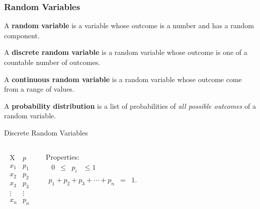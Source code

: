 \begin{frame}
  \frametitle{Random Variables}

  \begin{definition}
    A \textbf{random variable} is a variable whose outcome is a number
    and has a random component.
  \end{definition}

  {
    \begin{definition}
      A \textbf{discrete random variable} is a random variable whose
      outcome is one of a countable number of outcomes.
    \end{definition}
  }

  {
    \begin{definition}
      A \textbf{continuous random variable} is a random variable whose
      outcome come from a range of values.
    \end{definition}
  }

  {
    \begin{definition}
      A \textbf{probability distribution} is a list of probabilities of
      \textit{all possible outcomes} of a random variable.
    \end{definition}
  }

\end{frame}



\begin{frame}{Discrete Random Variables}

  \begin{columns}

    \begin{eqnarray*}
      \begin{array}{l|l}
        \mathrm{X} & p \\ \hline
        x_1 & p_1 \\
        x_2 & p_2 \\
        x_3 & p_3 \\
        \vdots & \vdots \\
        x_n & p_n
      \end{array}
    \end{eqnarray*}

    Properties:
    \begin{eqnarray*}
      \begin{array}{rcccl}
        0 & \leq & p_i & \leq 1
      \end{array}
      \\
      p_1 + p_2 + p_3 + \cdots + p_n & = & 1.
    \end{eqnarray*}

  \end{columns}
  
\end{frame}


